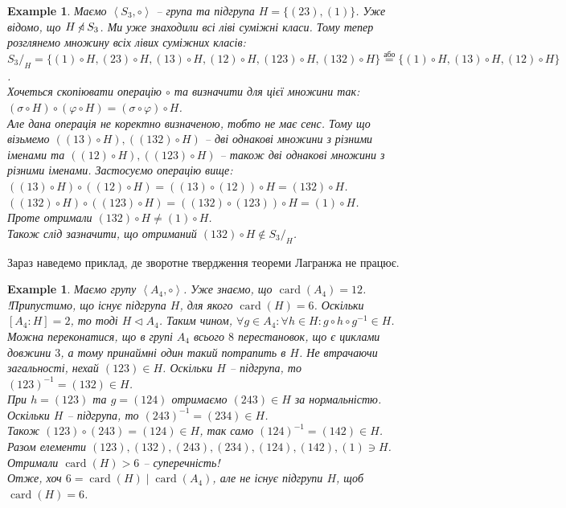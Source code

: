 \documentclass[a4paper, 10pt]{article}
\theoremstyle{theoremdd}
\theoremstyle{theoremdd}
\theoremstyle{theoremdd}
\theoremstyle{theoremdd}
\theoremstyle{theoremdd}
\newtheorem{example}[theorem]{Example}
\theoremstyle{theoremdd}
\theoremstyle{theoremdd}
\theoremstyle{theoremdd}
\theoremstyle{theoremdd}
\theoremstyle{theoremdd}
\theoremstyle{theoremdd}
\theoremstyle{theoremdd}
\theoremstyle{theoremdd}
\theoremstyle{theoremdd}
\theoremstyle{theoremdd}
\DeclareMathOperator{\card}{card}
\begin{document}
\begin{example}
Маємо $\left<S_3, \circ \right>$ -- група та підгрупа $H = \{(23), (1)\}$. Уже відомо, що $H \centernot\triangleleft S_3$. Ми уже знаходили всі ліві суміжні класи. Тому тепер розглянемо множину всіх лівих суміжних класів:\\
${S_3}/_H = \{ (1) \circ H, (23) \circ H, (13) \circ H, (12) \circ H, (123)\circ H, (132) \circ H \} \overset{\text{або}}{=} \{ (1) \circ H, (13) \circ H, (12) \circ H \}$.\\
Хочеться скопіювати операцію $\circ$ та визначити для цієї множини так:\\
$(\sigma \circ H) \circ (\varphi \circ H) = (\sigma \circ \varphi) \circ H$.\\
Але дана операція не коректно визначеною, тобто не має сенс. Тому що візьмемо $((13) \circ H), ( (132)\circ H)$ -- дві однакові множини з різними іменами та $( (12) \circ H), ( (123) \circ H)$ -- також дві однакові множини з різними іменами. Застосуємо операцію вище:\\
$((13) \circ H) \circ ((12)\circ H) = ((13)\circ (12)) \circ H = (132) \circ H$.\\
$((132) \circ H) \circ ((123) \circ H) = ((132) \circ (123)) \circ H = (1) \circ H$.\\
Проте отримали $(132) \circ H \neq (1) \circ H$.\\
Також слід зазначити, що отриманий $(132) \circ H \notin S_3/_H$.
\end{example}

Зараз наведемо приклад, де зворотне твердження теореми Лагранжа не працює.
\begin{example} Маємо групу $\left< A_4, \circ \right>$. Уже знаємо, що $\card(A_4) = 12$.\\
!Припустимо, що існує підгрупа $H$, для якого $\card(H) = 6$. Оскільки $[A_4 : H] = 2$, то тоді $H \triangleleft A_4$. Таким чином, $\forall g \in A_4: \forall h \in H: g \circ h \circ g^{-1} \in H$.\\
Можна переконатися, що в групі $A_4$ всього $8$ перестановок, що є циклами довжини $3$, а тому принаймні один такий потрапить в $H$. Не втрачаючи загальності, нехай $(123) \in H$. Оскільки $H$ -- підгрупа, то $(123)^{-1} = (132) \in H$.\\
При $h = (123)$ та $g = (124)$ отримаємо $(243) \in H$ за нормальністю. Оскільки $H$ -- підгрупа, то $(243)^{-1} = (234) \in H$.\\
Також $(123) \circ (243) = (124) \in H$, так само $(124)^{-1} = (142) \in H$.\\
Разом елементи $(123),(132),(243),(234),(124),(142),(1) \ni H$. Отримали $\card(H) > 6$ -- суперечність!\\
Отже, хоч $6 = \card(H) \mid \card(A_4)$, але не існує підгрупи $H$, щоб $\card(H) = 6$.
\end{example}
\end{document}
